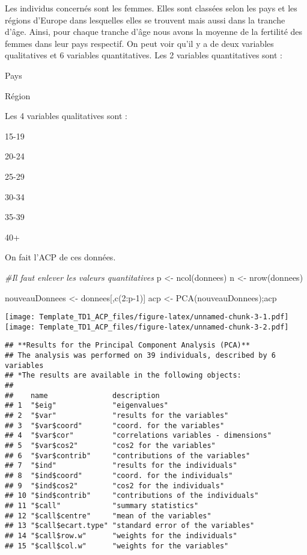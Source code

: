 \documentclass[
]{article}
\newenvironment{Shaded}{\begin{snugshade}}{\end{snugshade}}
\newcommand{\CommentTok}[1]{\textcolor[rgb]{0.56,0.35,0.01}{\textit{#1}}}
\newcommand{\DecValTok}[1]{\textcolor[rgb]{0.00,0.00,0.81}{#1}}
\newcommand{\FunctionTok}[1]{\textcolor[rgb]{0.00,0.00,0.00}{#1}}
\newcommand{\NormalTok}[1]{#1}
\newcommand{\OtherTok}[1]{\textcolor[rgb]{0.56,0.35,0.01}{#1}}
\newcommand{\SpecialCharTok}[1]{\textcolor[rgb]{0.00,0.00,0.00}{#1}}
\begin{document}
Les individus concernés sont les femmes. Elles sont classées selon les
pays et les régions d'Europe dans lesquelles elles se trouvent mais
aussi dans la tranche d'âge. Ainsi, pour chaque tranche d'âge nous avons
la moyenne de la fertilité des femmes dans leur pays respectif. On peut
voir qu'il y a de deux variables qualitatives et 6 variables
quantitatives. Les 2 variables quantitatives sont :

Pays

Région

Les 4 variables qualitatives sont :

15-19

20-24

25-29

30-34

35-39

40+

On fait l'ACP de ces données.

\begin{Shaded}
\begin{Highlighting}[]
\CommentTok{\#Il faut enlever les valeurs quantitatives }
\NormalTok{p }\OtherTok{\textless{}{-}} \FunctionTok{ncol}\NormalTok{(donnees)}
\NormalTok{n }\OtherTok{\textless{}{-}} \FunctionTok{nrow}\NormalTok{(donnees)}

\NormalTok{nouveauDonnees }\OtherTok{\textless{}{-}}\NormalTok{ donnees[,}\FunctionTok{c}\NormalTok{(}\DecValTok{2}\SpecialCharTok{:}\NormalTok{p}\DecValTok{{-}1}\NormalTok{)]}
\NormalTok{acp }\OtherTok{\textless{}{-}} \FunctionTok{PCA}\NormalTok{(nouveauDonnees);acp}
\end{Highlighting}
\end{Shaded}

\texttt{[image: Template\_TD1\_ACP\_files/figure-latex/unnamed-chunk-3-1.pdf]}
\texttt{[image: Template\_TD1\_ACP\_files/figure-latex/unnamed-chunk-3-2.pdf]}

\begin{verbatim}
## **Results for the Principal Component Analysis (PCA)**
## The analysis was performed on 39 individuals, described by 6 variables
## *The results are available in the following objects:
## 
##    name               description                          
## 1  "$eig"             "eigenvalues"                        
## 2  "$var"             "results for the variables"          
## 3  "$var$coord"       "coord. for the variables"           
## 4  "$var$cor"         "correlations variables - dimensions"
## 5  "$var$cos2"        "cos2 for the variables"             
## 6  "$var$contrib"     "contributions of the variables"     
## 7  "$ind"             "results for the individuals"        
## 8  "$ind$coord"       "coord. for the individuals"         
## 9  "$ind$cos2"        "cos2 for the individuals"           
## 10 "$ind$contrib"     "contributions of the individuals"   
## 11 "$call"            "summary statistics"                 
## 12 "$call$centre"     "mean of the variables"              
## 13 "$call$ecart.type" "standard error of the variables"    
## 14 "$call$row.w"      "weights for the individuals"        
## 15 "$call$col.w"      "weights for the variables"
\end{verbatim}
\end{document}
